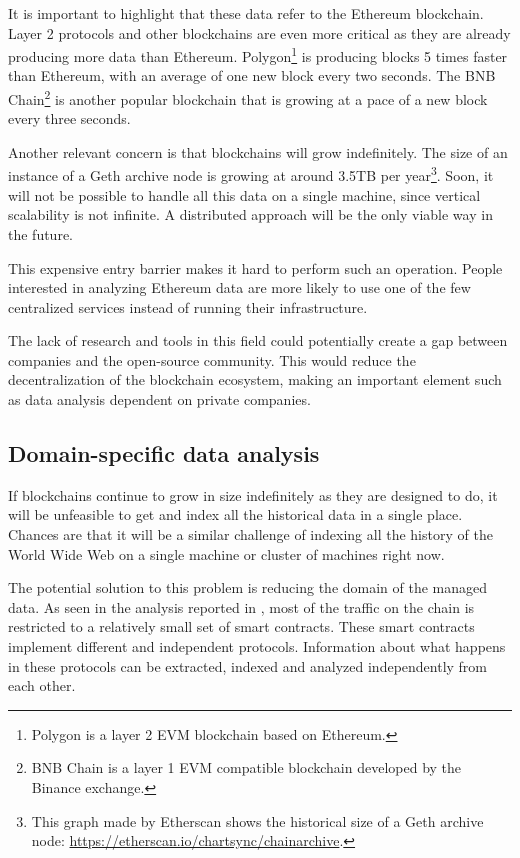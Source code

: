 It is important to highlight that these data refer to the Ethereum blockchain. Layer 2 protocols and other blockchains are even more critical as they are already producing more data than Ethereum. Polygon\footnote{Polygon is a layer 2 EVM blockchain based on Ethereum.} is producing blocks 5 times faster than Ethereum, with an average of one new block every two seconds. The BNB Chain\footnote{BNB Chain is a layer 1 EVM compatible blockchain developed by the Binance exchange.} is another popular blockchain that is growing at a pace of a new block every three seconds.

Another relevant concern is that blockchains will grow indefinitely. The size of an instance of a Geth archive node is growing at around 3.5TB per year\footnote{This graph made by Etherscan shows the historical size of a Geth archive node: \url{https://etherscan.io/chartsync/chainarchive}.}. Soon, it will not be possible to handle all this data on a single machine, since vertical scalability is not infinite. A distributed approach will be the only viable way in the future.

This expensive entry barrier makes it hard to perform such an operation. People interested in analyzing Ethereum data are more likely to use one of the few centralized services instead of running their infrastructure. 

The lack of research and tools in this field could potentially create a gap between companies and the open-source community. This would reduce the decentralization of the blockchain ecosystem, making an important element such as data analysis dependent on private companies.

\subsection{Domain-specific data analysis}

If blockchains continue to grow in size indefinitely as they are designed to do, it will be unfeasible to get and index all the historical data in a single place. Chances are that it will be a similar challenge of indexing all the history of the World Wide Web on a single machine or cluster of machines right now.

The potential solution to this problem is reducing the domain of the managed data. As seen in the analysis reported in , most of the traffic on the chain is restricted to a relatively small set of smart contracts. These smart contracts implement different and independent protocols. Information about what happens in these protocols can be extracted, indexed and analyzed independently from each other.

